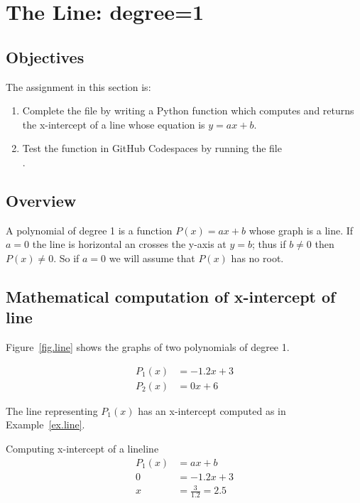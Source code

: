 \section{The Line: degree=1}
\label{sec.line}



\subsection{Objectives}
The assignment in this section is:
\begin{enumerate}
\item Complete the file  by writing a Python
  function which computes and returns the x-intercept of a line whose
  equation is ${y=a x + b}$.
\item Test the function in GitHub Codespaces by running the file\\
  .
\end{enumerate}

\subsection{Overview}


A polynomial of degree 1 is a function $P(x)=a x + b$ whose graph is a line.   If $a=0$ the
line is horizontal an crosses the y-axis at $y=b$; thus if $b\neq 0$ then $P(x)\neq 0$.
So if $a=0$ we will assume that $P(x)$ has no root.   

\subsection{Mathematical computation of x-intercept of line}


Figure~\ref{fig.line} shows the graphs of two polynomials of degree 1.

\begin{align*}
  P_1(x) &= -1.2 x + 3\\
  P_2(x) &= 0 x + 6
\end{align*}

The line representing $P_1(x)$ has an x-intercept computed as in Example~\ref{ex.line}.


\begin{example}{Computing x-intercept of a line}{line}
  \begin{align*}
  P_1(x) &= a x + b \\
  0  &= -1.2 x + 3\\
  x &= \frac{3}{1.2} = 2.5
  \end{align*}
\end{example}

